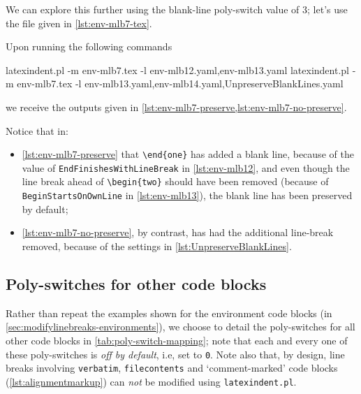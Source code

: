 	We can explore this further using the blank-line poly-switch value of $3$; let's use the file given
	in \cref{lst:env-mlb7-tex}.


	Upon running the following commands
	\begin{commandshell}
latexindent.pl -m env-mlb7.tex -l env-mlb12.yaml,env-mlb13.yaml
latexindent.pl -m env-mlb7.tex -l env-mlb13.yaml,env-mlb14.yaml,UnpreserveBlankLines.yaml
            \end{commandshell}
	we receive the outputs given in \cref{lst:env-mlb7-preserve,lst:env-mlb7-no-preserve}.


	Notice that in:
	\begin{itemize}
		\item \cref{lst:env-mlb7-preserve} that \lstinline!\end{one}! has added a blank line, because of the value of
		      \texttt{EndFinishesWithLineBreak} in \vref{lst:env-mlb12}, and even though the line break ahead of \lstinline!\begin{two}! should have been removed
		      (because of \texttt{BeginStartsOnOwnLine} in \vref{lst:env-mlb13}), the blank line has been preserved by default;
		\item \cref{lst:env-mlb7-no-preserve}, by contrast, has had the additional line-break removed, because of
		      the settings in \cref{lst:UnpreserveBlankLines}.
	\end{itemize}

\subsection{Poly-switches for other code blocks}
	Rather than repeat the examples shown for the environment code blocks (in \vref{sec:modifylinebreaks-environments}), we choose to detail the poly-switches for
	all other code blocks in \cref{tab:poly-switch-mapping}; note that each and every one of these poly-switches is \emph{off by default}, i.e, set to \texttt{0}. Note also that,
	by design, line breaks involving \texttt{verbatim}, \texttt{filecontents} and `comment-marked' code blocks (\vref{lst:alignmentmarkup}) can \emph{not} be
	modified using \texttt{latexindent.pl}.

